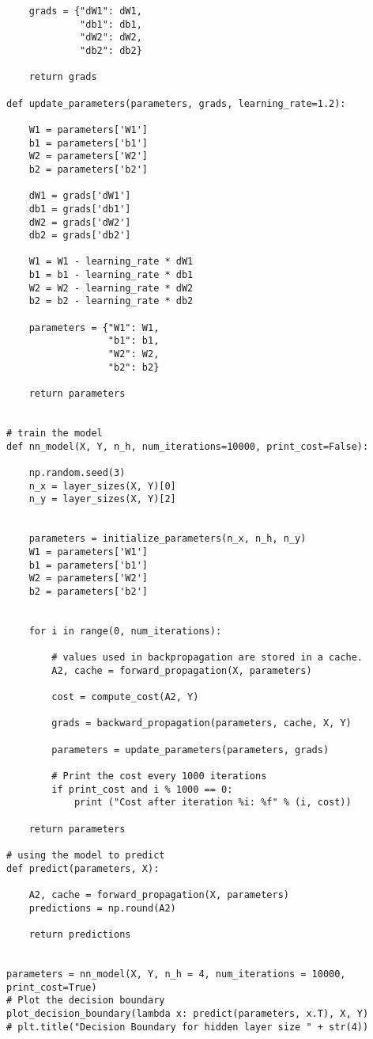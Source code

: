 \documentclass{article}
\begin{document}
\begin{lstlisting}
    grads = {"dW1": dW1,
             "db1": db1,
             "dW2": dW2,
             "db2": db2}

    return grads

def update_parameters(parameters, grads, learning_rate=1.2):

    W1 = parameters['W1']
    b1 = parameters['b1']
    W2 = parameters['W2']
    b2 = parameters['b2']

    dW1 = grads['dW1']
    db1 = grads['db1']
    dW2 = grads['dW2']
    db2 = grads['db2']

    W1 = W1 - learning_rate * dW1
    b1 = b1 - learning_rate * db1
    W2 = W2 - learning_rate * dW2
    b2 = b2 - learning_rate * db2

    parameters = {"W1": W1,
                  "b1": b1,
                  "W2": W2,
                  "b2": b2}

    return parameters


# train the model
def nn_model(X, Y, n_h, num_iterations=10000, print_cost=False):

    np.random.seed(3)
    n_x = layer_sizes(X, Y)[0]
    n_y = layer_sizes(X, Y)[2]


    parameters = initialize_parameters(n_x, n_h, n_y)
    W1 = parameters['W1']
    b1 = parameters['b1']
    W2 = parameters['W2']
    b2 = parameters['b2']


    for i in range(0, num_iterations):

        # values used in backpropagation are stored in a cache.
        A2, cache = forward_propagation(X, parameters)

        cost = compute_cost(A2, Y)

        grads = backward_propagation(parameters, cache, X, Y)

        parameters = update_parameters(parameters, grads)

        # Print the cost every 1000 iterations
        if print_cost and i % 1000 == 0:
            print ("Cost after iteration %i: %f" % (i, cost))

    return parameters

# using the model to predict
def predict(parameters, X):

    A2, cache = forward_propagation(X, parameters)
    predictions = np.round(A2)

    return predictions


parameters = nn_model(X, Y, n_h = 4, num_iterations = 10000, print_cost=True)
# Plot the decision boundary
plot_decision_boundary(lambda x: predict(parameters, x.T), X, Y)
# plt.title("Decision Boundary for hidden layer size " + str(4))

\end{lstlisting}
\end{document}
